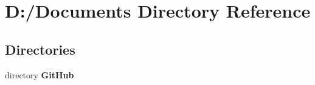 \section{D\-:/\-Documents Directory Reference}
\label{dir_63a46bc882553fb0fda9819bea5fa400}
\subsection*{Directories}
\begin{DoxyCompactItemize}
\item 
directory {\bf Git\-Hub}
\end{DoxyCompactItemize}

